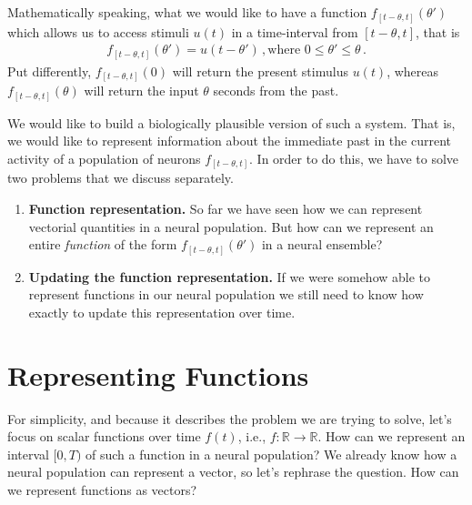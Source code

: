 \documentclass[10pt,letterpaper,oneside]{article}
\begin{document}
Mathematically speaking, what we would like to have a function $f_{[t - \theta, t]}(\theta')$ which allows us to access stimuli $u(t)$ in a time-interval from $[t - \theta, t]$, that is
\begin{align*}
	f_{[t - \theta, t]}(\theta') = u\left(t - \theta' \right) \,, \text{where } 0 \leq \theta' \leq \theta \,.
\end{align*}
Put differently, $f_{[t - \theta, t]}(0)$ will return the present stimulus $u(t)$, whereas $f_{[t - \theta, t]}(\theta)$ will return the input $\theta$ seconds from the past.

We would like to build a biologically plausible version of such a system. That is, we would like to represent information about the immediate past in the current activity of a population of neurons $f_{[t - \theta, t]}$. In order to do this, we have to solve two problems that we discuss separately.
\begin{enumerate}[1.]
	\item \textbf{Function representation.} So far we have seen how we can represent vectorial quantities in a neural population. But how can we represent an entire \emph{function} of the form $f_{[t - \theta, t]}(\theta')$ in a neural ensemble?
	\item \textbf{Updating the function representation.} If we were somehow able to represent functions in our neural population we still need to know how exactly to update this representation over time.
\end{enumerate}



\section{Representing Functions}

For simplicity, and because it describes the problem we are trying to solve, let's focus on scalar functions over time $f(t)$, i.e., $f : \mathbb{R} \longrightarrow \mathbb{R}$. How can we represent an interval $[0, T)$ of such a function in a neural population? We already know how a neural population can represent a vector, so let's rephrase the question. How can we represent functions as vectors?
\end{document}
